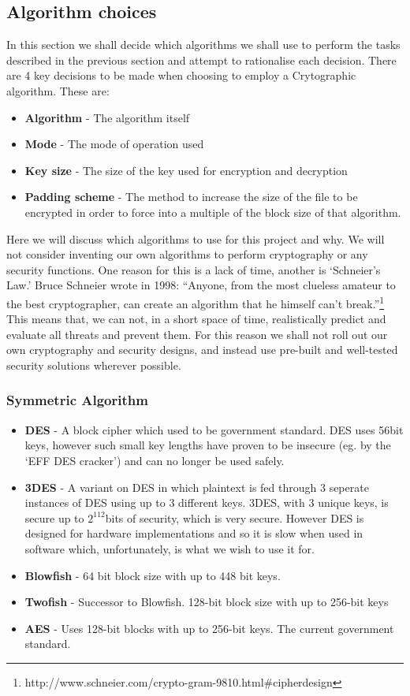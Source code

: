 \documentclass[12pt, titlepage]{article}
\begin{document}
\subsection{Algorithm choices}
In this section we shall decide which algorithms we shall use to perform the tasks described in the previous section and attempt to rationalise each decision.
\newline \indent There are 4 key decisions to be made when choosing to employ a Crytographic algorithm. These are:
\begin{itemize}
	\item \textbf{Algorithm} - The algorithm itself
	\item \textbf{Mode} - The mode of operation used
	\item \textbf{Key size} - The size of the key used for encryption and decryption
	\item \textbf{Padding scheme} - The method to increase the size of the file to be encrypted in order to force into a multiple of the block size of that algorithm.
\end{itemize}
Here we will discuss which algorithms to use for this project and why.
\newline \indent We will not consider inventing our own algorithms to perform cryptography or any security functions. One reason for this is a lack of time, another is `Schneier's Law.' Bruce Schneier wrote in 1998: ``Anyone, from the most clueless amateur to the best cryptographer, can create an algorithm that he himself can't break.''\footnote{http://www.schneier.com/crypto-gram-9810.html\#cipherdesign} This means that, we can not, in a short space of time, realistically predict and evaluate all threats and prevent them. For this reason we shall not roll out our own cryptography and security designs, and instead use pre-built and well-tested security solutions wherever possible.

\subsubsection{Symmetric Algorithm}
\begin{itemize}
	\item \textbf{DES} - A block cipher which used to be government standard. DES uses 56bit keys, however such small key lengths have proven to be insecure (eg. by the `EFF DES cracker') and can no longer be used safely.
	\item \textbf{3DES} - A variant on DES in which plaintext is fed through 3 seperate instances of DES using up to 3 different keys. 3DES, with 3 unique keys, is secure up to $2^112$bits of security, which is very secure. However DES is designed for hardware implementations and so it is slow when used in software which, unfortunately, is what we wish to use it for.
	\item \textbf{Blowfish} - 64 bit block size with up to 448 bit keys.
	\item \textbf{Twofish} - Successor to Blowfish. 128-bit block size with up to 256-bit keys
	\item \textbf{AES} - Uses 128-bit blocks with up to 256-bit keys. The current government standard.
\end{itemize}
\end{document}
